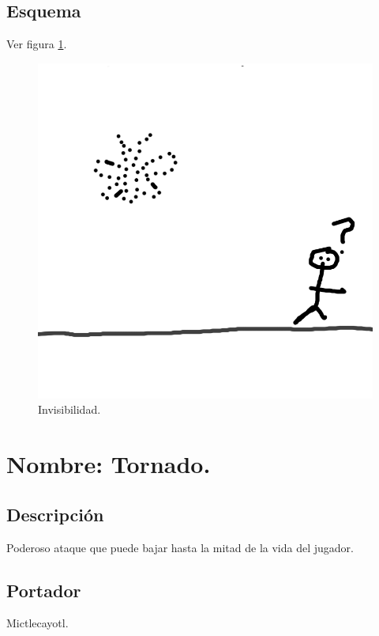 \subsection{Esquema}
			Ver figura \ref{fig:invisibilidad}.
			\begin{figure}
				\centering
				\includegraphics[height=0.2 \textheight]{Imagenes/invisibilidad}
				\caption{Invisibilidad.}
				\label{fig:invisibilidad}
			\end{figure}
\section{Nombre: Tornado.} \label{hab.tornado}
\subsection{Descripción}
Poderoso ataque que puede bajar hasta la mitad de la vida del jugador.
\subsection{Portador}
Mictlecayotl.
